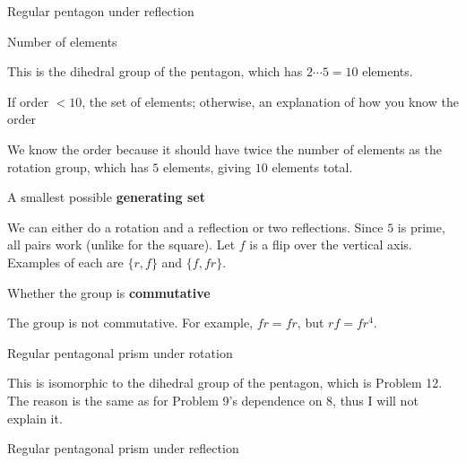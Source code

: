 \documentclass[../key.tex]{subfiles}
\begin{document}
\begin{outer_problem}
\item Regular pentagon under reflection
\end{outer_problem}

\begin{inner_problem}[start=1]
\item Number of elements
\end{inner_problem}

\noindent This is the dihedral group of the pentagon, which has $2\cdots 5=10$ elements.

\begin{inner_problem}
\item If order $< 10$, the set of elements; otherwise, an explanation of how you know the order
\end{inner_problem}

\noindent We know the order because it should have twice the number of elements as the rotation group, which has $5$ elements, giving $10$ elements total.

\begin{inner_problem}
\item A smallest possible \textbf{generating set}
\end{inner_problem}

\noindent We can either do a rotation and a reflection or two reflections. Since $5$ is prime, all pairs work (unlike for the square). Let $f$ is a flip over the vertical axis. Examples of each are $\{r,f\}$ and $\{f,fr\}$.

\begin{inner_problem}
\item Whether the group is \textbf{commutative}
\end{inner_problem}

\noindent The group is not commutative. For example, $fr=fr$, but $rf=fr^4$.

\begin{outer_problem}
\item Regular pentagonal prism under rotation
\end{outer_problem}

\noindent This is isomorphic to the dihedral group of the pentagon, which is Problem 12. The reason is the same as for Problem 9's dependence on 8, thus I will not explain it.

\begin{outer_problem}
\item Regular pentagonal prism under reflection
\end{outer_problem}
\end{document}
